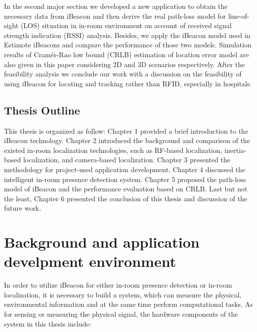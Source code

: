 \documentclass[12pt]{report}
\begin{document}
In the second major section we developed a new application to obtain the necessary data from iBeacon and then derive the real path-loss model for line-of-sight (LOS) situation in in-room environment on account of received signal strength indication (RSSI) analysis. Besides, we apply the iBeacon model used in Estimote iBeacons and compare the performance of those two models. Simulation results of Cramér-Rao low bound (CRLB) estimation of location error model are also given in this paper considering 2D and 3D scenarios respectively. After the feasibility analysis we conclude our work with a discussion on the feasibility of using iBeacon for locating and tracking rather than RFID, especially in hospitals.

\section{Thesis Outline}
This thesis is organized as follow: Chapter 1 provided a brief introduction to the iBeacon technology. Chapter 2 introduced the background and comparison of the existed in-room localization technologies, such as RF-based localization, inertia-based localization, and camera-based localization. Chapter 3 presented the methodology for project-used application development. Chapter 4 discussed the intelligent in-room presence detection system. Chapter 5 proposed the path-loss model of iBeacon and the performance evaluation based on CRLB. Last but not the least, Chapter 6 presented the conclusion of this thesis and discussion of the future work. 


\chapter{Background and application develpment environment}
In order to utilize iBeacon for either in-room presence detection or in-room localization, it is necessary to build a system, which can measure the physical, environmental information and at the same time perform computational tasks. As for sensing or measuring the physical signal, the hardware components of the system in this thesis include:
\end{document}
